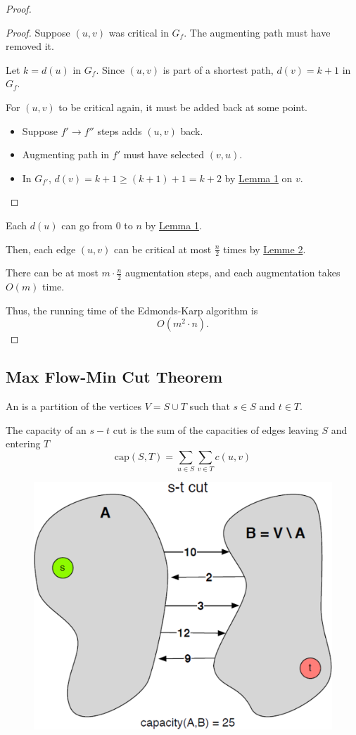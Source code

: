 \begin{itemize}
\begin{proof}
\begin{proof}
            Suppose $(u, v)$ was critical in $G_f$. The augmenting path must have removed it. 

            Let $k = d(u)$ in $G_f$. Since $(u, v)$ is part of a shortest path, $d(v) = k + 1$ in $G_f$.

            For $(u, v)$ to be critical again, it must be added back at some point. 
            \begin{itemize}
                \item Suppose $f' \to f''$ steps adds $(u, v)$ back.
                \item Augmenting path in $f'$ must have selected $(v, u)$.
                \item In $G_{f'}$, $d(v) = k + 1 \ge (k + 1) + 1 = k + 2$ by \hyperref[lem:edmonds-karp-1]{Lemma 1} on $v$.  \end{itemize}
        \end{proof}

        Each $d(u)$ can go from $0$ to $n$ by \hyperref[lem:edmonds-karp-1]{Lemma 1}.

        Then, each edge $(u, v)$ can be critical at most $\frac{n}{2}$ times by \hyperref[lem:edmonds-karp-2]{Lemme 2}.

        There can be at most $m \cdot \frac{n}{2}$ augmentation steps, and each augmentation takes $O(m)$ time.

        Thus, the running time of the Edmonds-Karp algorithm is \[
            O(m^2 \cdot n).
        \]
    \end{proof}
\end{itemize}

\subsection{Max Flow-Min Cut Theorem}

\begin{definition}[$s-t$ Cut]\label{def:s-t-cut}
    An  is a partition of the vertices $V = S \cup T$ such that $s \in S$ and $t \in T$.
\end{definition}

The capacity of an $s-t$ cut is the sum of the capacities of edges leaving $S$ and entering $T$ \[
    \text{cap}(S, T) = \sum_{u \in S} \sum_{v \in T} c(u, v)
\]

\begin{figure}[ht!]
    \centering
    \includegraphics[width=0.33\linewidth]{figures/st-cut.png}
\end{figure}

